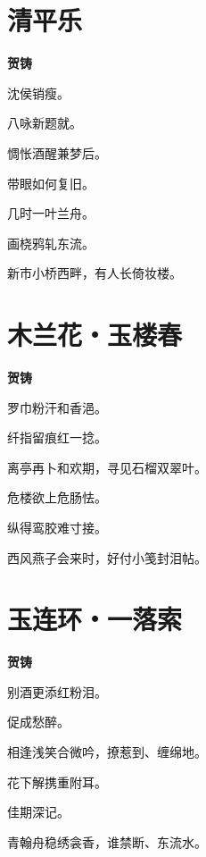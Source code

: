 \documentclass[12pt,a4paper]{ctexbook}
\begin{document}
\section{清平乐}
\textbf{贺铸}\par\vspace{0.5em}
沈侯销瘦。\par
八咏新题就。\par
惆怅酒醒兼梦后。\par
带眼如何复旧。\par
几时一叶兰舟。\par
画桡鸦轧东流。\par
新市小桥西畔，有人长倚妆楼。\par

\section{木兰花・玉楼春}
\textbf{贺铸}\par\vspace{0.5em}
罗巾粉汗和香浥。\par
纤指留痕红一捻。\par
离亭再卜和欢期，寻见石榴双翠叶。\par
危楼欲上危肠怯。\par
纵得鸾胶难寸接。\par
西风燕子会来时，好付小笺封泪帖。\par

\section{玉连环・一落索}
\textbf{贺铸}\par\vspace{0.5em}
别酒更添红粉泪。\par
促成愁醉。\par
相逢浅笑合微吟，撩惹到、缠绵地。\par
花下解携重附耳。\par
佳期深记。\par
青翰舟稳绣衾香，谁禁断、东流水。\par
\end{document}
